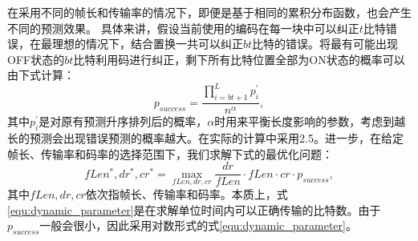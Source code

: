 在采用不同的帧长和传输率的情况下，即便是基于相同的累积分布函数，也会产生不同的预测效果。
具体来讲，假设当前使用的编码在每一块中可以纠正$t$比特错误，在最理想的情况下，结合置换一共可以纠正$bt$比特的错误。将最有可能出现OFF状态的$bt$比特利用码进行纠正，剩下所有比特位置全部为ON状态的概率可以由下式计算：
\begin{equation}
p_{success} = \frac{\prod_{i = bt+1}^{L} p_i^{'}}{n^\alpha},
\end{equation}
其中$p_i^{'}$是对原有预测升序排列后的概率，$\alpha$时用来平衡长度影响的参数，考虑到越长的预测会出现错误预测的概率越大。在实际的计算中采用2.5。进一步，在给定帧长、传输率和码率的选择范围下，我们求解下式的最优化问题：
\begin{equation}
\label{equ:dynamic_parameter}
fLen^\ast, dr^\ast, cr^\ast = \max_{fLen, dr, cr} \frac{dr}{fLen}\cdot fLen\cdot cr \cdot p_{success},
\end{equation}
其中$fLen,dr,cr$依次指帧长、传输率和码率。本质上，式\ref{equ:dynamic_parameter}是在求解单位时间内可以正确传输的比特数。由于$p_{success}$一般会很小，因此采用对数形式的式\ref{equ:dynamic_parameter}。